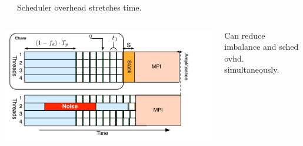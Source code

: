 {\begin{frame}[label=hybridstatdyn]
\begin{columns}
\begin{center}
  \end{center}
\vspace*{-0.3in}
\begin{center}
{\tiny Scheduler overhead stretches time.}
\end{center}
\end{columns}
\begin{columns}
\vspace*{-0.1in}

\begin{center}
\includegraphics[scale=0.31]{./images/threadedCompRegion-hybrid}
\end{center}
\vspace*{-0.3in}
\begin{center}
{\tiny Can reduce imbalance and sched
  ovhd. simultaneously.}
\end{center}
\end{columns}
\end{frame}
}

